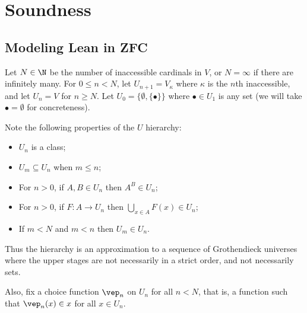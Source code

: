 \section{Soundness}
\subsection{Modeling Lean in ZFC}
Let $N\in\N$ be the number of inaccessible cardinals in $V$, or $N=\infty$ if there are infinitely many. For $0\le n<N$, let $U_{n+1}=V_\kappa$ where $\kappa$ is the $n$th inaccessible, and let $U_n=V$ for $n\ge N$. Let $U_0=\{\emptyset,\{\bullet\}\}$ where $\bullet\in U_1$ is any set (we will take $\bullet=\emptyset$ for concreteness).

Note the following properties of the $U$ hierarchy:
\begin{itemize}
\item $U_n$ is a class;
\item $U_m\subseteq U_n$ when $m\le n$;
\item For $n>0$, if $A,B\in U_n$ then $A^B\in U_n$;
\item For $n>0$, if $F:A\to U_n$ then $\bigcup_{x\in A}F(x)\in U_n$;
\item If $m<N$ and $m<n$ then $U_m\in U_n$.
\end{itemize}

Thus the hierarchy is an approximation to a sequence of Grothendieck universes where the upper stages are not necessarily in a strict order, and not necessarily sets.

Also, fix a choice function $\vep_n$ on $U_n$ for all $n<N$, that is, a function such that $\vep_n(x)\in x$ for all $x\in U_n$.

